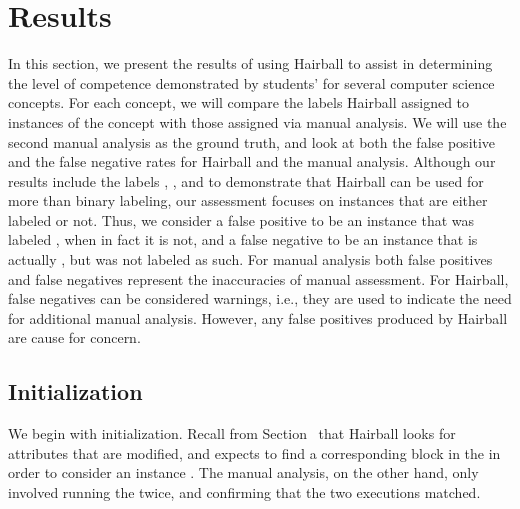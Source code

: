 \section{Results}

In this section, we present the results of using Hairball to assist in
determining the level of competence demonstrated by students'  for
several computer science concepts. For each concept, we will compare the labels
Hairball assigned to instances of the concept with those assigned via manual
analysis. We will use the second manual analysis as the ground truth, and look
at both the false positive and the false negative rates for Hairball and the
manual analysis. Although our results include the labels \semincor{}, \incor{},
and \incom{} to demonstrate that Hairball can be used for more than binary
labeling, our assessment focuses on instances that are either labeled
\correct{} or not. Thus, we consider a false positive to be an instance that
was labeled \correct{}, when in fact it is not, and a false negative to be an
instance that is actually \correct{}, but was not labeled as such. For manual
analysis both false positives and false negatives represent the inaccuracies of
manual assessment. For Hairball, false negatives can be considered warnings,
i.e., they are used to indicate the need for additional manual
analysis. However, any false positives produced by Hairball are cause for
concern.

\subsection{Initialization}
We begin with initialization. Recall from Section~ that
Hairball looks for attributes that are modified, and expects to find a
corresponding \abs{} block in the \initzone{} in order to consider an instance
\correct{}. The manual analysis, on the other hand, only involved running the
\sprogram{} twice, and confirming that the two executions matched.

